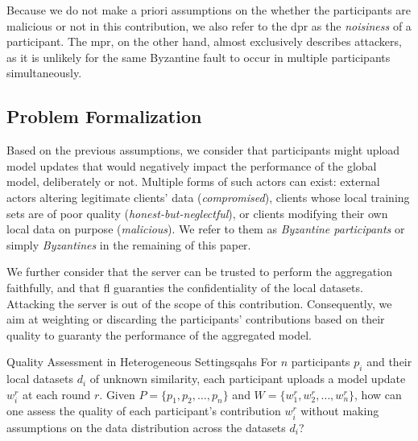 Because we do not make a priori assumptions on the whether the participants are malicious or not in this contribution, we also refer to the \gls{dpr} as the \emph{noisiness} of a participant.
The \gls{mpr}, on the other hand, almost exclusively describes attackers, as it is unlikely for the same Byzantine fault to occur in multiple participants simultaneously.

\subsection{Problem Formalization\label{sec:problem.formalization}}

Based on the previous assumptions, we consider that participants might upload model updates that would negatively impact the performance of the global model, deliberately or not.
Multiple forms of such actors can exist: external actors altering legitimate clients' data (\ie \emph{compromised}), clients whose local training sets are of poor quality (\ie \emph{honest-but-neglectful}), or clients modifying their own local data on purpose (\ie \emph{malicious}).
We refer to them as \emph{Byzantine participants} or simply \emph{Byzantines} in the remaining of this paper.

We further consider that the server can be trusted to perform the aggregation faithfully, and that \gls{fl} guaranties the confidentiality of the local datasets.
Attacking the server is out of the scope of this contribution.
Consequently, we aim at weighting or discarding the participants' contributions based on their quality to guaranty the performance of the aggregated model.



\begin{problembox}{Quality Assessment in Heterogeneous Settings}{qahs}
  For $n$ participants $p_i$ and their local datasets $d_i$ of unknown similarity, each participant uploads a model update $w_i^r$ at each round $r$. Given $P = \lbrace p_1, p_2, \dots, p_n \rbrace$ and $W = \lbrace w_1^r, w_2^r, \dots, w_n^r \rbrace$, how can one assess the quality of each participant's contribution $w_i^r$ without making assumptions on the data distribution across the datasets $d_i$?
\end{problembox}